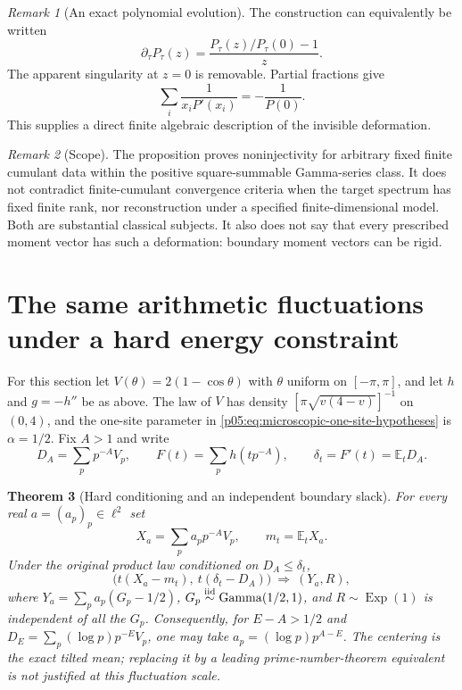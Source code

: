 \documentclass[11pt,letterpaper]{article}
\newtheorem{theorem}{Theorem}[section]
\theoremstyle{definition}
\theoremstyle{remark}
\newtheorem{remark}[theorem]{Remark}
\newcommand{\1}{\mathbf 1}
\begin{document}
\begin{remark}[An exact polynomial evolution]
The construction can equivalently be written
\[
 \partial_\tau P_\tau(z)
      =\frac{P_\tau(z)/P_\tau(0)-1}{z}.
\]
The apparent singularity at $z=0$ is removable. Partial fractions give
\[
 \sum_i\frac{1}{x_iP'(x_i)}=-\frac{1}{P(0)}.
\]
This supplies a direct finite
algebraic description of the invisible deformation.
\end{remark}

\begin{remark}[Scope]
The proposition proves noninjectivity for arbitrary fixed finite
cumulant data within the positive square-summable Gamma-series class.
It does not contradict finite-cumulant convergence criteria when the
target spectrum has fixed finite rank, nor reconstruction under a
specified finite-dimensional model.  Both are substantial classical
subjects.  It also does not say that every prescribed moment vector
has such a deformation: boundary moment vectors can be rigid.
\end{remark}

\section{The same arithmetic fluctuations under a hard energy constraint}
\label{p05:sec:hard-prime-constraint}

For this section let $V(\theta)=2(1-\cos\theta)$ with $\theta$
uniform on $[-\pi,\pi]$, and let $h$ and $g=-h''$ be as above.
The law of $V$ has density
$[\pi\sqrt{v(4-v)}]^{-1}$ on $(0,4)$, and the one-site parameter
in \eqref{p05:eq:microscopic-one-site-hypotheses} is $\alpha=1/2$.
Fix $A>1$ and write
\[
 D_A=\sum_p p^{-A}V_p,\qquad
 F(t)=\sum_p h(tp^{-A}),\qquad
 \delta_t=F'(t)=\mathbb E_tD_A.
\]

\begin{theorem}[Hard conditioning and an independent boundary slack]
\label{p05:thm:hard-prime-gamma-limit}
For every real $a=(a_p)_p\in\ell^2$ set
\[
 X_a=\sum_p a_pp^{-A}V_p,\qquad
 m_t=\mathbb E_tX_a.
\]
Under the original product law conditioned on $D_A\le\delta_t$,
\begin{equation}\label{p05:eq:hard-prime-joint-limit}
 \big(t(X_a-m_t),\ t(\delta_t-D_A)\big)
 \ \Longrightarrow\ (Y_a,R),
\end{equation}
where $Y_a=\sum_pa_p(G_p-1/2)$,
$G_p\overset{\rm iid}{\sim}\operatorname{Gamma}(1/2,1)$,
and $R\sim\operatorname{Exp}(1)$ is independent of all the $G_p$.
Consequently, for $E-A>1/2$ and
$D_E=\sum_p(\log p)p^{-E}V_p$, one may take
$a_p=(\log p)p^{A-E}$.
The centering is the exact tilted mean; replacing it by a leading
prime-number-theorem equivalent is not justified at this fluctuation
scale.
\end{theorem}
\end{document}
